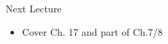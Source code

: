 \documentclass[aspectratio=1610]{beamer}
\begin{document}

%			
%			

\begin{frame}[wide]{Next Lecture}
	\begin{itemize}
		\item Cover Ch. 17 and part of Ch.7/8
	\end{itemize}
\end{frame}
\end{document}
